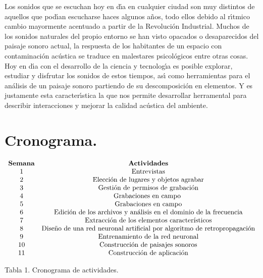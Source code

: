 Los sonidos que se escuchan hoy en d\'{\i}a en cualquier ciudad son muy
distintos de aquellos que pod\'{\i}an escucharse haces algunos a\~{n}os, todo
ellos debido al r\'{\i}tmico cambio mayormente acentuado a partir de la
Revoluci\'{o}n Industrial. Muchos de los sonidos naturales del propio entorno
se han visto opacados o desaparecidos del paisaje sonoro actual, la respuesta
de los habitantes de un espacio con contaminaci\'{o}n ac\'{u}stica se traduce
en malestares psicol\'{o}gicos entre otras cosas. Hoy en d\'{\i}a con el
desarrollo de la ciencia y tecnolog\'{\i}a es posible explorar, estudiar y
disfrutar los sonidos de estos tiempos, as\'{\i} como herramientas para el
an\'{a}lisis de un paisaje sonoro partiendo de su descomposici\'{o}n en
elementos. Y es justamente esta caracter\'{\i}stica la que nos permite
desarrollar herramental para describir interacciones y mejorar la calidad
ac\'{u}stica del ambiente.

\section{Cronograma.}

\begin{center}
    $%
    \begin{array}
        [c]{cc}%
        \text{\textbf{Semana}} & \text{\textbf{Actividades}}\\
        \text{1} & \text{Entrevistas}\\
        \text{2} & \text{Elecci\'{o}n de lugares y objetos agrabar}\\
        \text{3} & \text{Gesti\'{o}n de permisos de grabaci\'{o}n}\\
        \text{4} & \text{Grabaciones en campo }\\
        \text{5} & \text{Grabaciones en campo}\\
        \text{6} & \text{Edici\'{o}n de los archivos y an\'{a}lisis en el dominio de
        la frecuencia}\\
        \text{7} & \text{Extracci\'{o}n de los elementos caracter\'{\i}sticos}\\
        \text{8} & \text{Dise\~{n}o de una red neuronal artificial por algoritmo de
        retropropagaci\'{o}n}\\
        \text{9} & \text{Entrenamiento de la red neuronal}\\
        \text{10} & \text{Construcci\'{o}n de paisajes sonoros}\\
        \text{11} & \text{Construcci\'{o}n de aplicaci\'{o}n}%
    \end{array}
    $

    Tabla 1. Cronograma de actividades.
\end{center}



